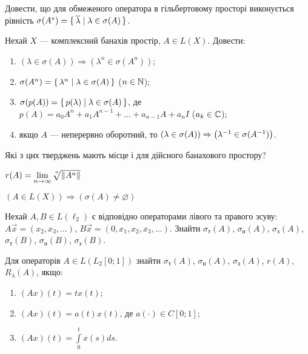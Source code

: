 
\begin{exercise}
    Довести, що для обмеженого оператора в гільбертовому просторі виконується
    рівність $\sigma(A^{*}) = \set{\overline{\lambda} \mid \lambda \in \sigma (A)}$.
\end{exercise}

\begin{exercise}
    Нехай $X$ --- комплексний банахів простір, $A \in L(X)$. Довести:
    \begin{enumerate}
        \item $\left( \lambda \in \sigma(A)\right) \Rightarrow \left( \lambda^n \in \sigma(A^n)\right)$;
        \item $\sigma(A^n) = \set{\lambda^n \mid \lambda \in \sigma(A)}$ ($n\in \mathbb{N}$);
        \item $\sigma(p(A)) = \set{p(\lambda) \mid \lambda \in \sigma(A)}$, де $p(A) = a_0 A^n + a_1 A^{n-1} + ... + a_{n-1} A + a_n I$ ($a_k \in \mathbb{C}$);
        \item якщо $A$ --- неперервно оборотний, то $\left( \lambda \in \sigma(A)\right) \Rightarrow \left( \lambda^{-1} \in \sigma(A^{-1})\right)$.
    \end{enumerate}
    Які з цих тверджень мають місце і для дійсного банахового простору?
\end{exercise}

\begin{theory}
    \begin{theorem*}
        $r(A) = \underset{n \to \infty}{\lim} \sqrt[\leftroot{-3}\uproot{3}n]{\norm{A^n}}$
    \end{theorem*}
    \begin{theorem*}
        $\left( A \in L(X)\right) \Rightarrow (\sigma(A) \neq \varnothing)$
    \end{theorem*}
\end{theory}

\begin{exercise}
    Нехай $A, B \in L(\ell_2)$ є відповідно операторами лівого та правого зсуву:
    $A \vec{x} = (x_2, x_3, ...)$, $B\vec{x} = (0, x_1, x_2, x_3, ...)$.
    Знайти $\sigma_\text{т}(A)$, $\sigma_\text{н}(A)$, $\sigma_\text{з}(A)$,
    $\sigma_\text{т}(B)$, $\sigma_\text{н}(B)$, $\sigma_\text{з}(B)$.
\end{exercise}

\begin{exercise}\label{N:1_7_14}
    Для операторів $A \in L(L_2 [0;1])$ знайти $\sigma_\text{т}(A)$, $\sigma_\text{н}(A)$, $\sigma_\text{з}(A)$,
    $r(A)$, $R_\lambda(A)$, якщо:
    \begin{enumerate}
        \item $(Ax)(t) = t x(t)$;
        \item $(Ax)(t) = a(t) x(t)$, де $a(\cdot) \in C[0;1]$;
        \item $(Ax)(t) = \int\limits_0^t x(s) ds$.
    \end{enumerate}
\end{exercise}


